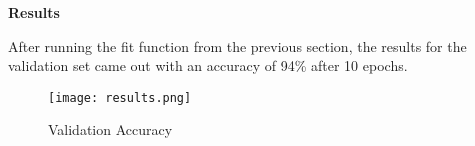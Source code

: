 \doublespacing
\setlength{\parindent}{1cm}

\begin{flushleft}
  \textbf{Results}
\end{flushleft}

After running the fit function from the previous section, the results for the validation set came out with an accuracy of 94\% after 10 epochs.

\begin{figure}
  \caption{Validation Accuracy}
  \texttt{[image: results.png]}
\end{figure}
